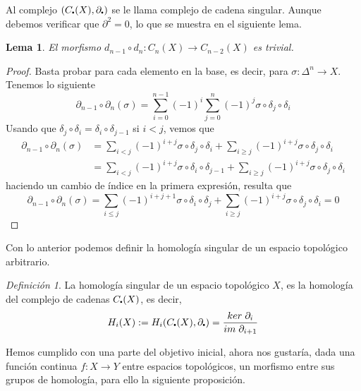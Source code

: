\documentclass[aop]{imsart2}
\theoremstyle{plain}
\newtheorem{lema}[teo]{Lema}
\theoremstyle{remark}
\newtheorem{dfn}[teo]{Definición}
\newcommand{\im}[1]{im\hspace{1mm}#1}
\newcommand{\kr}[1]{ker\hspace{1mm}#1}
\newcommand\sbullet[1][.5]{\mathbin{\vcenter{\hbox{\scalebox{#1}{$\bullet$}}}}}
\begin{document}
\noindent Al complejo $(C_{\sbullet}(X),\partial_{\sbullet})$ se le llama complejo de cadena 
singular. Aunque debemos verificar que $\partial^{2}=0$, lo que se muestra en el siguiente lema.

\begin{lema}
    El morfismo $d_{n-1}\circ d_{n}:C_{n}(X)\to C_{n-2}(X)$ es trivial.
\end{lema}

\begin{proof}
    Basta probar para cada elemento en la base, es decir, para $\sigma:\Delta^{n}\to X$. Tenemos 
    lo siguiente
    \begin{equation*}
        \partial_{n-1}\circ \partial_{n}(\sigma)=\sum_{i=0}^{n-1}(-1)^{i}\sum_{j=0}^{n}(-1)^{j}
        \sigma\circ\delta_{j}\circ\delta_{i}
    \end{equation*}
    Usando que $\delta_{j}\circ\delta_{i}=\delta_{i}\circ\delta_{j-1}$ si $i<j$, vemos que
    \begin{align*}
        \partial_{n-1}\circ \partial_{n}(\sigma) &= \sum_{i<j}(-1)^{i+j}\sigma\circ\delta_{j}
        \circ\delta_{i}+\sum_{i\geq j}(-1)^{i+j}\sigma\circ\delta_{j}\circ\delta_{i} \\
        &= \sum_{i<j}(-1)^{i+j}\sigma\circ\delta_{i}\circ\delta_{j-1}
        +\sum_{i\geq j}(-1)^{i+j}\sigma\circ\delta_{j}\circ\delta_{i}
    \end{align*}
    haciendo un cambio de índice en la primera expresión, resulta que
    \begin{equation*}
        \partial_{n-1}\circ \partial_{n}(\sigma)=\sum_{i\leq j}(-1)^{i+j+1}\sigma\circ\delta_{i}
        \circ\delta_{j}+\sum_{i\geq j}(-1)^{i+j}\sigma\circ\delta_{j}\circ\delta_{i}=0
    \end{equation*}
\end{proof}

\noindent Con lo anterior podemos definir la homología singular de un espacio topológico 
arbitrario.

\begin{dfn}
    La homología singular de un espacio topológico $X$, es la homología del complejo de
    cadenas $C_{\sbullet}(X)$, es decir,
    \begin{equation*}
        H_{i}(X):=H_{i}(C_{\sbullet}(X),\partial_{\sbullet})
        =\frac{\kr{\partial_{i}}}{\im{\partial_{i+1}}}
    \end{equation*}
\end{dfn}

\noindent Hemos cumplido con una parte del objetivo inicial, ahora nos gustaría, dada una función
continua $f:X\to Y$ entre espacios topológicos, un morfismo entre sus grupos de homología, para 
ello la siguiente proposición.
\end{document}
